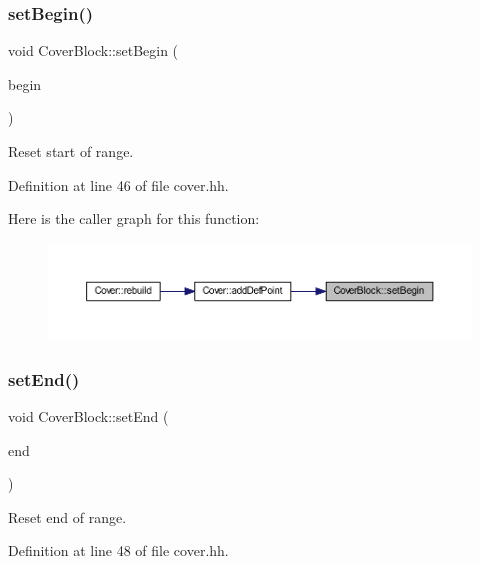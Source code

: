 \subsubsection{\texorpdfstring{setBegin()}{setBegin()}}
{\footnotesize\ttfamily void Cover\+Block\+::set\+Begin (\begin{DoxyParamCaption}\item[{const \mbox{\hyperlink{class_pcode_op}{Pcode\+Op}} $\ast$}]{begin }\end{DoxyParamCaption})\hspace{0.3cm}{\ttfamily [inline]}}



Reset start of range. 



Definition at line 46 of file cover.\+hh.

Here is the caller graph for this function\+:
\nopagebreak
\begin{figure}[H]
\begin{center}
\leavevmode
\includegraphics[width=350pt]{class_cover_block_a9c1ef0ab93cc4107a954cd4842ca1d27_icgraph}
\end{center}
\end{figure}
\mbox{\label{class_cover_block_aa6171bf30cc73dcf75bafdbe71b83a5d}} 
\subsubsection{\texorpdfstring{setEnd()}{setEnd()}}
{\footnotesize\ttfamily void Cover\+Block\+::set\+End (\begin{DoxyParamCaption}\item[{const \mbox{\hyperlink{class_pcode_op}{Pcode\+Op}} $\ast$}]{end }\end{DoxyParamCaption})\hspace{0.3cm}{\ttfamily [inline]}}



Reset end of range. 



Definition at line 48 of file cover.\+hh.


